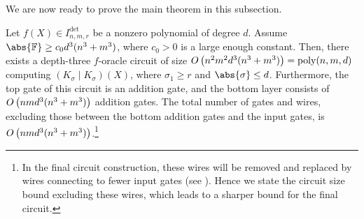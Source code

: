 \documentclass[10pt,a4paper]{amsart}
\DeclareMathOperator{\poly}{poly}
\newcommand*\F{\mathbb{F}}
\newcommand*\bigO[1]{%
    O\kern-0.0pt\left(#1\right)
}
\begin{document}
We are now ready to prove the main theorem in this subsection.

\begin{thrm}\label{thrm:bideterminant_canonical_extraction}
    Let $f(X) \in I^{\det}_{n, m, r}$ be a nonzero polynomial of degree $d$.
    Assume $\abs{\F} \geq c_0 d^3(n^3+m^3)$, where $c_0>0$ is a large enough constant.
    Then, there exists a depth-three $f$-oracle circuit of size $\bigO{n^2m^2d^3(n^3+m^3)} = \poly(n,m,d)$ computing $(K_\sigma \mid K_\sigma)(X)$, where $\sigma_1 \geq r$ and $\abs{\sigma} \leq d$.
    Furthermore, the top gate of this circuit is an addition gate, and the bottom layer consists of $\bigO{nmd^3(n^3+m^3)}$ addition gates.
    The total number of gates and wires, excluding those between the bottom addition gates and the input gates, is $\bigO{nmd^3(n^3+m^3)}$.\footnote{In the final circuit construction, these wires will be removed and replaced by wires connecting to fewer input gates (see ).
    Hence we state the circuit size bound excluding these wires, which leads to a sharper bound for the final circuit.}
\end{thrm}
\end{document}
